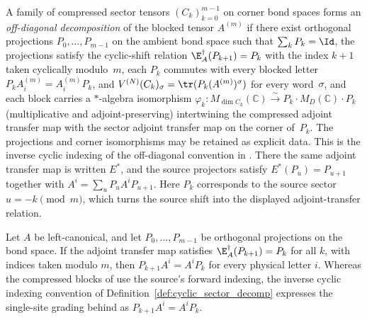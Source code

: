 \begin{definition}%
    \label{def:cyclic_sector_decomp}
    \leanok
    A family of compressed sector tensors
    $(C_k)_{k=0}^{m-1}$ on corner bond spaces forms an \emph{off-diagonal
        decomposition} of the blocked tensor $A^{(m)}$ if there exist orthogonal
    projections $P_0,\ldots,P_{m-1}$ on the ambient bond space such that
    $\sum_k P_k = \Id$, the projections satisfy the cyclic-shift relation
    $\E_A^\dagger(P_{k+1}) = P_k$ with the index $k+1$ taken cyclically
    modulo~$m$, each $P_k$ commutes with every blocked letter
    $P_k A^{(m)}_i = A^{(m)}_i P_k$, and
    $V^{(N)}(C_k)_\sigma = \tr(P_k (A^{(m)})^\sigma)$ for every word~$\sigma$,
    and each block carries a $\ast$-algebra isomorphism
    $\varphi_k : M_{\dim C_k}(\mathbb{C}) \xrightarrow{\sim}
        P_k \cdot M_D(\mathbb{C}) \cdot P_k$
    (multiplicative and adjoint-preserving) intertwining the compressed adjoint
    transfer map with the sector adjoint transfer map on the corner of~$P_k$.
    The projections and corner isomorphisms may be retained as explicit data.
    This is the inverse cyclic indexing of the off-diagonal convention in
    \cite[Appendix~A]{DeLasCuevas2017Irreducible}. There the same adjoint
    transfer map is written $E^*$, and the source projectors satisfy
    $E^*(P_u)=P_{u+1}$ together with
    $A^i=\sum_u P_u A^i P_{u+1}$. Here $P_k$ corresponds to the source
    sector $u=-k \pmod m$, which turns the source shift into the displayed
    adjoint-transfer relation.
\end{definition}

\begin{lemma}
    \label{thm:offdiag_shift_adjoint_cyclic_shift}
    \leanok
    Let $A$ be left-canonical, and let $P_0,\ldots,P_{m-1}$ be orthogonal
    projections on the bond space. If the adjoint transfer map satisfies
    $\E_A^\dagger(P_{k+1})=P_k$ for all $k$, with indices taken modulo $m$,
    then $P_{k+1}A^i=A^iP_k$ for every physical letter $i$.
    Whereas the compressed blocks of \cite[eq.~Auprop]{DeLasCuevas2017Irreducible}
    use the source's forward indexing, the inverse cyclic indexing convention
    of Definition~\ref{def:cyclic_sector_decomp} expresses the single-site
    grading behind \cite[eq.~Aoffdiag]{DeLasCuevas2017Irreducible} as
    $P_{k+1}A^i=A^iP_k$.
\end{lemma}


